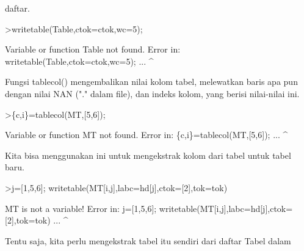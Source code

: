 \documentclass[a4paper,10pt]{article}
\begin{document}
\begin{eulernotebook}
\begin{eulercomment}
\begin{eulercomment}
\begin{eulercomment}
\begin{eulercomment}
\begin{eulercomment}
\begin{eulercomment}
\begin{eulercomment}
\begin{eulercomment}
\begin{eulercomment}
\begin{eulercomment}
\begin{eulercomment}
\begin{eulercomment}
\begin{eulercomment}
\begin{eulercomment}
\begin{eulercomment}
\begin{eulercomment}
\begin{eulercomment}
\begin{eulercomment}
\begin{eulercomment}
\begin{eulercomment}
\begin{eulercomment}
\begin{eulercomment}
\begin{eulercomment}
\begin{eulercomment}
\begin{eulercomment}
\begin{eulercomment}
\begin{eulercomment}
\begin{eulercomment}
\begin{eulercomment}
\begin{eulercomment}
\begin{eulercomment}
\begin{eulercomment}
\begin{eulercomment}
\begin{eulercomment}
\begin{eulercomment}
\begin{eulercomment}
\begin{eulercomment}
\begin{eulercomment}
\begin{eulercomment}
\begin{eulercomment}
\begin{eulercomment}
\begin{eulercomment}
\begin{eulercomment}
\begin{eulercomment}
\begin{eulercomment}
\begin{eulercomment}
\begin{eulercomment}
\begin{eulercomment}
\begin{eulercomment}
\begin{eulercomment}
\begin{eulercomment}
\begin{eulercomment}
\begin{eulercomment}
\begin{eulercomment}
\begin{eulercomment}
\begin{eulercomment}
\begin{eulercomment}
\begin{eulercomment}
\begin{eulercomment}
\begin{eulercomment}
\begin{eulercomment}
\begin{eulercomment}
\begin{eulercomment}
\begin{eulercomment}
\begin{eulercomment}
\begin{eulercomment}
\begin{eulercomment}
daftar.
\end{eulercomment}
\begin{eulerprompt}
>writetable(Table,ctok=ctok,wc=5);
\end{eulerprompt}
\begin{euleroutput}
  Variable or function Table not found.
  Error in:
  writetable(Table,ctok=ctok,wc=5); ...
                  ^
\end{euleroutput}
\begin{eulercomment}
Fungsi tablecol() mengembalikan nilai kolom tabel, melewatkan baris
apa pun dengan nilai NAN ("." dalam file), dan indeks kolom, yang
berisi nilai-nilai ini.
\end{eulercomment}
\begin{eulerprompt}
>\{c,i\}=tablecol(MT,[5,6]);
\end{eulerprompt}
\begin{euleroutput}
  Variable or function MT not found.
  Error in:
  \{c,i\}=tablecol(MT,[5,6]); ...
                   ^
\end{euleroutput}
\begin{eulercomment}
Kita bisa menggunakan ini untuk mengekstrak kolom dari tabel untuk
tabel baru.
\end{eulercomment}
\begin{eulerprompt}
>j=[1,5,6]; writetable(MT[i,j],labc=hd[j],ctok=[2],tok=tok)
\end{eulerprompt}
\begin{euleroutput}
  MT is not a variable!
  Error in:
  j=[1,5,6]; writetable(MT[i,j],labc=hd[j],ctok=[2],tok=tok) ...
                               ^
\end{euleroutput}
\begin{eulercomment}
Tentu saja, kita perlu mengekstrak tabel itu sendiri dari daftar Tabel
dalam 
\end{eulercomment}
\end{eulercomment}
\end{eulercomment}
\end{eulercomment}
\end{eulercomment}
\end{eulercomment}
\end{eulercomment}
\end{eulercomment}
\end{eulercomment}
\end{eulercomment}
\end{eulercomment}
\end{eulercomment}
\end{eulercomment}
\end{eulercomment}
\end{eulercomment}
\end{eulercomment}
\end{eulercomment}
\end{eulercomment}
\end{eulercomment}
\end{eulercomment}
\end{eulercomment}
\end{eulercomment}
\end{eulercomment}
\end{eulercomment}
\end{eulercomment}
\end{eulercomment}
\end{eulercomment}
\end{eulercomment}
\end{eulercomment}
\end{eulercomment}
\end{eulercomment}
\end{eulercomment}
\end{eulercomment}
\end{eulercomment}
\end{eulercomment}
\end{eulercomment}
\end{eulercomment}
\end{eulercomment}
\end{eulercomment}
\end{eulercomment}
\end{eulercomment}
\end{eulercomment}
\end{eulercomment}
\end{eulercomment}
\end{eulercomment}
\end{eulercomment}
\end{eulercomment}
\end{eulercomment}
\end{eulercomment}
\end{eulercomment}
\end{eulercomment}
\end{eulercomment}
\end{eulercomment}
\end{eulercomment}
\end{eulercomment}
\end{eulercomment}
\end{eulercomment}
\end{eulercomment}
\end{eulercomment}
\end{eulercomment}
\end{eulercomment}
\end{eulercomment}
\end{eulercomment}
\end{eulercomment}
\end{eulercomment}
\end{eulercomment}
\end{eulercomment}
\end{eulernotebook}
\end{document}
